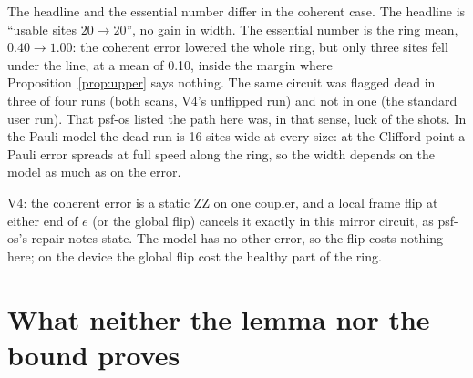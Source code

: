 \documentclass[10pt,a4paper]{article}
\theoremstyle{definition}
\theoremstyle{remark}
\begin{document}
The headline and the essential number differ in the coherent case. The headline is ``usable sites $20\to20$'', no
gain in width. The essential number is the ring mean, $0.40\to1.00$: the coherent error lowered the whole ring, but
only three sites fell under the line, at a mean of 0.10, inside the margin where Proposition~\ref{prop:upper} says
nothing. The same circuit was flagged dead in three of four runs (both scans, V4's unflipped run) and not in one (the
standard user run). That psf-os listed the path here was, in that sense, luck of the shots.
In the Pauli model the dead run is 16 sites wide at every size: at the Clifford point a Pauli error spreads at full
speed along the ring, so the width depends on the model as much as on the error.

V4: the coherent error is a static ZZ on one coupler, and a local frame flip at either end of $e$ (or the global flip)
cancels it exactly in this mirror circuit, as psf-os's repair notes state. The model has no other error, so the flip
costs nothing here; on the device the global flip cost the healthy part of the ring.

\section{What neither the lemma nor the bound proves}
\end{document}
